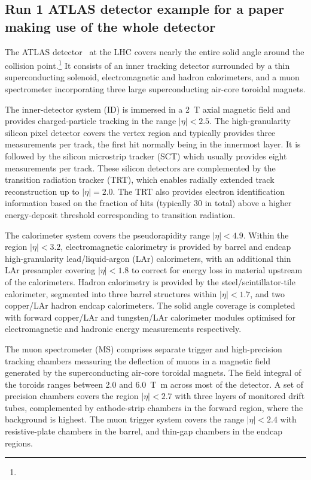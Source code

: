 \subsection{Run 1 ATLAS detector example for a paper making use of the whole detector}
\label{sec:atlas1b}

The ATLAS detector~\cite{PERF-2007-01} at the LHC covers nearly the entire solid angle around the collision point.\footnote{\AtlasCoordFootnote}
It consists of an inner tracking detector surrounded by a thin superconducting solenoid, electromagnetic and hadron calorimeters,
and a muon spectrometer incorporating three large superconducting air-core toroidal magnets.

The inner-detector system (ID) is immersed in a \qty{2}{\tesla} axial magnetic field 
and provides charged-particle tracking in the range \(|\eta| < 2.5\).
The high-granularity silicon pixel detector covers the vertex region and typically provides three measurements per track, 
the first hit normally being in the innermost layer.
It is followed by the silicon microstrip tracker (SCT) which usually provides eight measurements per track.
These silicon detectors are complemented by the transition radiation tracker (TRT),
which enables radially extended track reconstruction up to \(|\eta| = 2.0\). 
The TRT also provides electron identification information 
based on the fraction of hits (typically 30 in total) above a higher energy-deposit threshold corresponding to transition radiation.

The calorimeter system covers the pseudorapidity range \(|\eta| < 4.9\).
Within the region \(|\eta|< 3.2\), electromagnetic calorimetry is provided by barrel and 
endcap high-granularity lead/liquid-argon (LAr) calorimeters,
with an additional thin LAr presampler covering \(|\eta| < 1.8\)
to correct for energy loss in material upstream of the calorimeters.
Hadron calorimetry is provided by the steel/scintillator-tile calorimeter,
segmented into three barrel structures within \(|\eta| < 1.7\), and two copper/LAr hadron endcap calorimeters.
The solid angle coverage is completed with forward copper/LAr and tungsten/LAr calorimeter modules
optimised for electromagnetic and hadronic energy measurements respectively.

The muon spectrometer (MS) comprises separate trigger and
high-precision tracking chambers measuring the deflection of muons in a magnetic field generated by the superconducting air-core toroidal magnets.
The field integral of the toroids ranges between \num{2.0} and \qty{6.0}{\tesla\metre}
across most of the detector. 
A set of precision chambers covers the region \(|\eta| < 2.7\) with three layers of monitored drift tubes,
complemented by cathode-strip chambers in the forward region, where the background is highest.
The muon trigger system covers the range \(|\eta| < 2.4\) with resistive-plate chambers in the barrel, and thin-gap chambers in the endcap regions.


